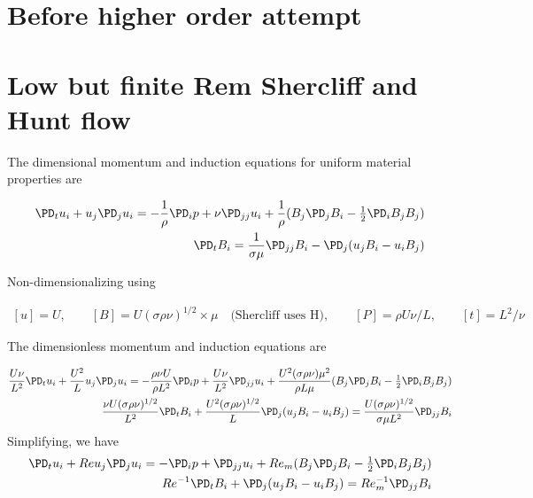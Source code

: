 \documentclass[11pt]{article}
\begin{document}
\doublespacing
\MOONSTITLE
\maketitle

\section{Before higher order attempt}
\section{Low but finite Rem Shercliff and Hunt flow}
The dimensional momentum and induction equations for uniform material properties are

\begin{equation}\begin{aligned}
\PD_t u_i+u_j\PD_j u_i = -\frac{1}{\rho} \PD_i p+ \nu \PD_{jj} u_i + \frac{1}{\rho} (B_j \PD_j B_i - \tfrac{1}{2} \PD_i B_j B_j) \\
\PD_t B_i = \frac{1}{\sigma \mu} \PD_{jj} B_i - \PD_j (u_j B_i - u_i B_j)
\end{aligned} \end{equation}

Non-dimensionalizing using

\begin{equation}\begin{aligned}
	[u] = U, \qquad
	[B] = U (\sigma \rho \nu)^{1/2} \times \mu \quad \text{(Shercliff uses H)}, \qquad
	[P] = \rho U \nu / L, \qquad
	[t] = L^2 / \nu
\end{aligned} \end{equation}

The dimensionless momentum and induction equations are

\begin{equation}\begin{aligned}
\frac{U \nu}{L^2} \PD_t u_i+ \frac{U^2}{L} u_j\PD_j u_i =-\frac{\rho \nu U}{\rho L^2}\PD_i p+ \frac{U \nu}{L^2} \PD_{jj} u_i + \frac{U^2 (\sigma \rho \nu) \mu^2}{\rho L \mu} (B_j \PD_j B_i - \tfrac{1}{2} \PD_i B_j B_j) \\
\frac{\nu U (\sigma \rho \nu)^{1/2}}{L^2} \PD_t B_i + \frac{U^2 (\sigma \rho \nu)^{1/2}}{L} \PD_j (u_j B_i - u_i B_j) = \frac{U (\sigma \rho \nu)^{1/2}}{\sigma \mu L^2} \PD_{jj} B_i
\end{aligned} \end{equation}
Simplifying, we have
\begin{equation}\begin{aligned}
\PD_t u_i+ Re u_j\PD_j u_i =-\PD_i p+ \PD_{jj} u_i + Re_m (B_j \PD_j B_i - \tfrac{1}{2} \PD_i B_j B_j) \\
Re^{-1} \PD_t B_i + \PD_j (u_j B_i - u_i B_j) = Re_m^{-1} \PD_{jj} B_i
\end{aligned} \end{equation}
\end{document}
